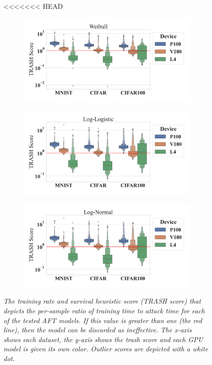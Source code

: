 \documentclass[sn-mathphys-num]{sn-jnl}%
\newcommand{\cm}[1]{\textit{{\color{blue}#1}}}
\begin{document}
\begin{figure}[tph!]
    \centering
<<<<<<< HEAD
    \captionsetup[subfigure]{skip=0pt} %
    \begin{subfigure}[b]{\linewidth}
        \centering
        \includegraphics[width=.7\linewidth]{plots/combined/weibull_trash_score.pdf}
        \caption{}
    \end{subfigure}
    \begin{subfigure}[b]{\linewidth}
        \centering
        \includegraphics[width=.7\linewidth]{plots/combined/log_logistic_trash_score.pdf}
        \caption{ }
    \end{subfigure}
    \begin{subfigure}[b]{\linewidth}
        \centering
        \includegraphics[width=.7\linewidth]{plots/combined/log_normal_trash_score.pdf}
        \caption{}
    \end{subfigure}
    \caption{\cm{The \textit{training rate and survival heuristic} score (TRASH score) that depicts the per-sample ratio of training time to attack time for each of the tested AFT models.
    If this value is greater than one (the red line), then the model can be discarded as ineffective. The x-axis shows each dataset, the y-axis shows the \acrshort{trash} score and each GPU model is given its own color. Outlier scores are depicted with a white dot.}}

\end{figure}
\end{document}
